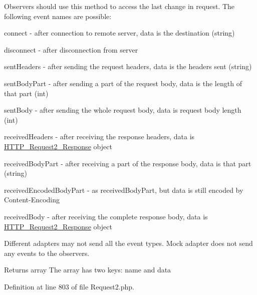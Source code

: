 Observers should use this method to access the last change in request. The following event names are possible\+: 
\begin{DoxyItemize}
\item \textquotesingle{}connect\textquotesingle{} -\/ after connection to remote server, data is the destination (string) 
\item \textquotesingle{}disconnect\textquotesingle{} -\/ after disconnection from server 
\item \textquotesingle{}sent\+Headers\textquotesingle{} -\/ after sending the request headers, data is the headers sent (string) 
\item \textquotesingle{}sent\+Body\+Part\textquotesingle{} -\/ after sending a part of the request body, data is the length of that part (int) 
\item \textquotesingle{}sent\+Body\textquotesingle{} -\/ after sending the whole request body, data is request body length (int) 
\item \textquotesingle{}received\+Headers\textquotesingle{} -\/ after receiving the response headers, data is \hyperlink{classHTTP__Request2__Response}{H\+T\+T\+P\+\_\+\+Request2\+\_\+\+Response} object 
\item \textquotesingle{}received\+Body\+Part\textquotesingle{} -\/ after receiving a part of the response body, data is that part (string) 
\item \textquotesingle{}received\+Encoded\+Body\+Part\textquotesingle{} -\/ as \textquotesingle{}received\+Body\+Part\textquotesingle{}, but data is still encoded by Content-\/\+Encoding 
\item \textquotesingle{}received\+Body\textquotesingle{} -\/ after receiving the complete response body, data is \hyperlink{classHTTP__Request2__Response}{H\+T\+T\+P\+\_\+\+Request2\+\_\+\+Response} object 
\end{DoxyItemize}Different adapters may not send all the event types. Mock adapter does not send any events to the observers.

\begin{DoxyReturn}{Returns}
array The array has two keys\+: \textquotesingle{}name\textquotesingle{} and \textquotesingle{}data\textquotesingle{} 
\end{DoxyReturn}


Definition at line 803 of file Request2.\+php.

